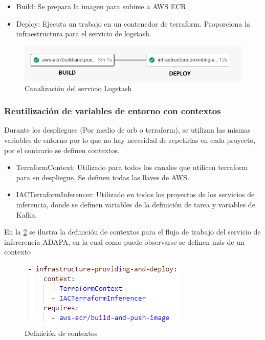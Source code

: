 \begin {itemize}
\item Build: Se prepara la imagen para subirse a AWS ECR.
\item Deploy: Ejecuta un trabajo en un contenedor de terraform. Proporciona la infraestructura para el servicio de logstash.
\end {itemize}

\begin{figure}[H]
	\centering
	\includegraphics[width=1\linewidth]{bibliografia/Imagenes/kafkaLogstashPipeline.png}
	\caption {Canalización del servicio Logstash}
	\label {pipelineKafkaLogstash}
\end {figure}
	
\subsubsection {Reutilización de variables de entorno con contextos}

Durante los despliegues (Por medio de orb o terraform), se utilizan las mismas variables de entorno por lo que no hay necesidad de repetirlas en cada proyecto, por el contrario se definen contextos.

\begin{itemize}
	\item TerraformContext: Utilizado para todos los canales que utilicen terraform para su despliegue. Se definen todas las llaves de AWS. 
	\item IACTerraformInferencer: Utilizado en todos los proyectos de los servicios de inferencia, donde se definen variables de la definición de tarea y variables de Kafka. 
\end{itemize}

En la \ref{circlecontext} se ilustra la definición de contextos para el flujo de trabajo del servicio de infererencia ADAPA, en la cual como puede observarse se definen más de un contexto

\begin{figure}[H]
	\centering
	\includegraphics[width=0.7\linewidth]{bibliografia/Imagenes/contextos.png}
	\caption {Definición de contextos}
	\label {circlecontext}
\end {figure}


